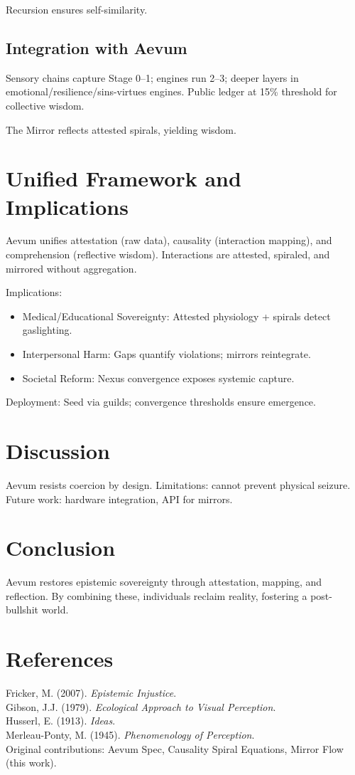 \documentclass[11pt,a4paper]{article}
\theoremstyle{plain}
\begin{document}
Recursion ensures self-similarity.

\subsection{Integration with Aevum}

Sensory chains capture Stage 0--1; engines run 2--3; deeper layers in emotional/resilience/sins-virtues engines. Public ledger at 15\% threshold for collective wisdom.

The Mirror reflects attested spirals, yielding wisdom.

\section{Unified Framework and Implications}

Aevum unifies attestation (raw data), causality (interaction mapping), and comprehension (reflective wisdom). Interactions are attested, spiraled, and mirrored without aggregation.

Implications:
\begin{itemize}
    \item Medical/Educational Sovereignty: Attested physiology + spirals detect gaslighting.
    \item Interpersonal Harm: Gaps quantify violations; mirrors reintegrate.
    \item Societal Reform: Nexus convergence exposes systemic capture.
\end{itemize}

Deployment: Seed via guilds; convergence thresholds ensure emergence.

\section{Discussion}

Aevum resists coercion by design. Limitations: cannot prevent physical seizure. Future work: hardware integration, API for mirrors.

\section{Conclusion}

Aevum restores epistemic sovereignty through attestation, mapping, and reflection. By combining these, individuals reclaim reality, fostering a post-bullshit world.

\section*{References}

Fricker, M. (2007). \textit{Epistemic Injustice}.\\
Gibson, J.J. (1979). \textit{Ecological Approach to Visual Perception}.\\
Husserl, E. (1913). \textit{Ideas}.\\
Merleau-Ponty, M. (1945). \textit{Phenomenology of Perception}.\\
Original contributions: Aevum Spec, Causality Spiral Equations, Mirror Flow (this work).
\end{document}
